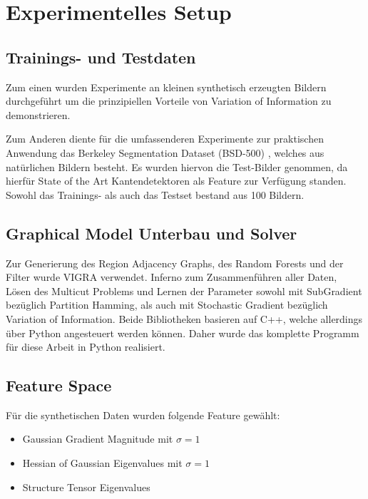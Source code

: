 \chapter{Experimentelles Setup}\label{ch:mathtest} %

\section{Trainings- und Testdaten}

Zum einen wurden Experimente an kleinen synthetisch erzeugten Bildern durchgeführt um die prinzipiellen Vorteile von Variation of Information zu demonstrieren. 

Zum Anderen diente für die umfassenderen Experimente zur praktischen Anwendung das Berkeley Segmentation Dataset (BSD-500) \cite{BSD}, welches aus natürlichen Bildern besteht. Es wurden hiervon die Test-Bilder genommen, da hierfür State of the Art Kantendetektoren als Feature zur Verfügung standen. Sowohl das Trainings- als auch das Testset bestand aus 100 Bildern.


\section{Graphical Model Unterbau und Solver}


Zur Generierung des Region Adjacency Graphs, des Random Forests und der Filter wurde VIGRA \cite{VIGRA} verwendet. Inferno \cite{Inferno} zum Zusammenführen aller Daten, Lösen des Multicut Problems und Lernen der Parameter sowohl mit SubGradient bezüglich Partition Hamming, als auch mit Stochastic Gradient bezüglich Variation of Information. Beide Bibliotheken basieren auf C++, welche allerdings über Python angesteuert werden können. Daher wurde das komplette Programm für diese Arbeit in Python realisiert.



\section{Feature Space}

Für die synthetischen Daten wurden folgende Feature gewählt:
\begin{itemize}
	\item Gaussian Gradient Magnitude mit $\sigma=1$
	\item Hessian of Gaussian Eigenvalues mit $\sigma=1$
	\item Structure Tensor Eigenvalues
\end{itemize}

